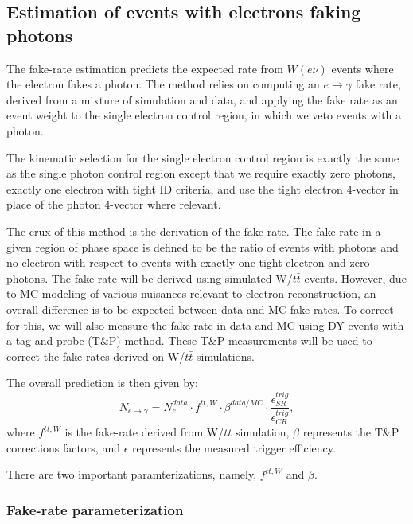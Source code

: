 \subsection{Estimation of events with electrons faking photons}

The fake-rate estimation predicts the expected rate from $W(e\nu)$ 
events where the electron fakes a photon.  The method relies on
computing an $e\rightarrow\gamma$ fake rate, derived from a mixture
of simulation and data, and applying the fake rate as an event weight
to the single electron control region, in which we veto events with
a photon.  

The kinematic selection for the single electron control region is exactly the 
same as the single photon control region except that we require exactly 
zero photons, exactly one electron with tight ID criteria, and use the tight electron
4-vector in place of the photon 4-vector where relevant. 

The crux of this method is the derivation of the fake rate.  The fake
rate in a given region of phase space is defined to be the ratio of events 
with photons and no electron with respect 
to events with exactly one tight electron and zero photons.  The 
fake rate will be derived using simulated W/$t\bar{t}$ events.  
However, due to MC modeling of various nuisances relevant to electron
reconstruction, an overall difference is to be expected between 
data and MC fake-rates.  To correct for this, we will also 
measure the fake-rate in data and MC using DY events with a 
tag-and-probe (T\&P) method.  These T\&P measurements will be 
used to correct the fake rates derived on W/$t\bar{t}$ simulations.

The overall prediction is then given by:
\begin{equation} \label{eqn:fake_pred}
  N_{e\rightarrow\gamma} = N_{e}^{data} \cdot f^{tt,W} \cdot \beta^{data/MC} \cdot \frac{\epsilon^{trig}_{SR}}{\epsilon^{trig}_{CR}},
\end{equation}
where $f^{tt,W}$ is the fake-rate derived from W/$t\bar{t}$ simulation, 
$\beta$ represents the T\&P corrections factors, and $\epsilon$ represents 
the measured trigger efficiency.

There are two important paramterizations, namely, $f^{tt,W}$ and $\beta$.  

\subsubsection{Fake-rate parameterization}

